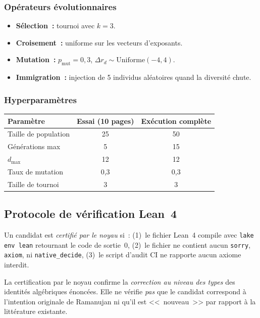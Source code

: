 \subsubsection{Opérateurs évolutionnaires}
\begin{itemize}
  \item \textbf{Sélection~:} tournoi avec $k=3$.
  \item \textbf{Croisement~:} uniforme sur les vecteurs d'exposants.
  \item \textbf{Mutation~:} $p_{\mathrm{mut}} = 0{,}3$, $\Delta r_d \sim \mathrm{Uniforme}(-4, 4)$.
  \item \textbf{Immigration~:} injection de 5 individus aléatoires quand la diversité chute.
\end{itemize}

\subsubsection{Hyperparamètres}
\begin{center}
\begin{tabular}{lcc}
\toprule
\textbf{Paramètre} & \textbf{Essai (10 pages)} & \textbf{Exécution complète} \\
\midrule
Taille de population & 25 & 50 \\
Générations max & 5 & 15 \\
$d_{\max}$ & 12 & 12 \\
Taux de mutation & 0,3 & 0,3 \\
Taille de tournoi & 3 & 3 \\
\bottomrule
\end{tabular}
\end{center}

\subsection{Protocole de vérification Lean~4}

\begin{definition}
Un candidat est \emph{certifié par le noyau} si~: (1)~le fichier Lean~4 compile avec \texttt{lake env lean} retournant le code de sortie~0, (2)~le fichier ne contient aucun \texttt{sorry}, \texttt{axiom}, ni \texttt{native\_decide}, (3)~le script d'audit CI ne rapporte aucun axiome interdit.
\end{definition}

\begin{remark}
La certification par le noyau confirme la \emph{correction au niveau des types} des identités algébriques énoncées. Elle ne vérifie \emph{pas} que le candidat correspond à l'intention originale de Ramanujan ni qu'il est <<~nouveau~>> par rapport à la littérature existante.
\end{remark}
